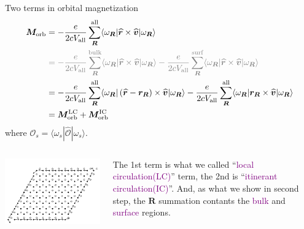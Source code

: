 \documentclass{beamer}
\newcommand{\purple}{\textcolor{purple}}
\begin{document}
    \begin{frame}{Two terms in orbital magnetization}\small
      \begin{equation}\begin{aligned}
        \bm{M}_{\text{orb}} &= -\frac{e}{2cV_{\text{all}}}\sum_{\bm{R}}^{\text{all}} \langle\omega_{\bm{R}}|\widehat{\bm{r}}\times\widehat{\bm{v}}|\omega_{\bm{R}}\rangle\\
        &\;{\color{gray}= -\frac{e}{2cV_{\text{all}}}\sum_{\bm{R}}^{\text{bulk}}\langle\omega_{\bm{R}}|\widehat{\bm{r}}\times\widehat{\bm{v}}|\omega_{\bm{R}}\rangle 
        -\frac{e}{2cV_{\text{all}}}\sum_{\bm{R}}^{\text{surf}}\langle\omega_{\bm{R}}|\widehat{\bm{r}}\times\widehat{\bm{v}}|\omega_{\bm{R}}\rangle} \\
        &= -\frac{e}{2cV_{\text{all}}}\sum_{\bm{R}}^{\text{all}} \langle\omega_{\bm{R}}|\left(\widehat{\bm{r}}-\bm{r}_{\bm{R}}\right)\times\widehat{\bm{v}}|\omega_{\bm{R}}\rangle
        -\frac{e}{2cV_{\text{all}}}\sum_{\bm{R}}^{\text{all}} \langle\omega_{\bm{R}}|\bm{r}_{\bm{R}}\times\widehat{\bm{v}}|\omega_{\bm{R}}\rangle\\
        &= \bm{M}_{\text{orb}}^{\text{LC}} + \bm{M}_{\text{orb}}^{\text{IC}}
      \end{aligned}\end{equation}
      where \(\mathcal{O}_s = \langle\omega_s|\widehat{\mathcal{O}}|\omega_s\rangle\).
      \begin{columns}
        \begin{column}{0.3\textwidth}
          \includegraphics[width=\textwidth]{figure/edge-solid.png}
        \end{column}
        \begin{column}{0.7\textwidth}
          \begin{block}{}
            The 1st term is what we called ``\purple{local circulation(LC)}'' term, the 2nd is ``\purple{itinerant circulation(IC)}''. And, as what we show in second step, the \(\bm{R}\) summation contants the \purple{bulk} and \purple{surface} regions. 
          \end{block}
        \end{column}
      \end{columns}
    \end{frame}
\end{document}
